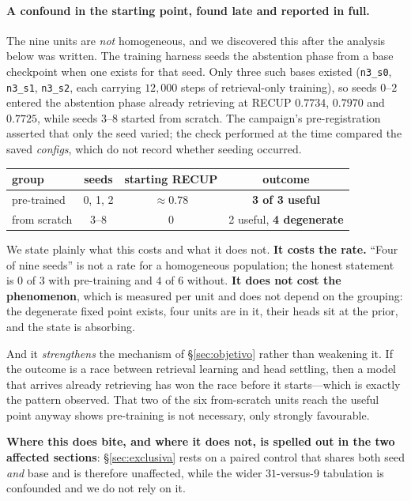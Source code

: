 \documentclass[11pt]{article}
\begin{document}
\paragraph{A confound in the starting point, found late and reported in full.} The nine units are
\emph{not} homogeneous, and we discovered this after the analysis below was written. The training
harness seeds the abstention phase from a base checkpoint when one exists for that seed. Only three
such bases existed (\texttt{n3\_s0}, \texttt{n3\_s1}, \texttt{n3\_s2}, each carrying $12{,}000$
steps of retrieval-only training), so seeds $0$--$2$ entered the abstention phase already retrieving
at RECUP $0.7734$, $0.7970$ and $0.7725$, while seeds $3$--$8$ started from scratch. The campaign's
pre-registration asserted that only the seed varied; the check performed at the time compared the
saved \emph{configs}, which do not record whether seeding occurred.

\begin{center}
\begin{tabular}{lccc}
\toprule
group & seeds & starting RECUP & outcome \\
\midrule
pre-trained & 0, 1, 2 & $\approx 0.78$ & \textbf{3 of 3 useful} \\
from scratch & 3--8 & $0$ & 2 useful, \textbf{4 degenerate} \\
\bottomrule
\end{tabular}
\end{center}

We state plainly what this costs and what it does not. \textbf{It costs the rate.} ``Four of nine
seeds'' is not a rate for a homogeneous population; the honest statement is $0$ of $3$ with
pre-training and $4$ of $6$ without. \textbf{It does not cost the phenomenon}, which is measured per
unit and does not depend on the grouping: the degenerate fixed point exists, four units are in it,
their heads sit at the prior, and the state is absorbing.

And it \emph{strengthens} the mechanism of \S\ref{sec:objetivo} rather than weakening it. If the
outcome is a race between retrieval learning and head settling, then a model that arrives already
retrieving has won the race before it starts---which is exactly the pattern observed. That two of the
six from-scratch units reach the useful point anyway shows pre-training is not necessary, only
strongly favourable.

\textbf{Where this does bite, and where it does not, is spelled out in the two affected sections}:
\S\ref{sec:exclusiva} rests on a paired control that shares both seed \emph{and} base and is
therefore unaffected, while the wider $31$-versus-$9$ tabulation is confounded and we do not rely on
it.
\end{document}
